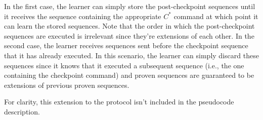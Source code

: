 In the first case, the learner can simply store the post-checkpoint sequences until it receives the sequence containing the appropriate $C^*$ command at which point it can learn the stored sequences. Note that the order in which the post-checkpoint sequences are executed is irrelevant since they're extensions of each other. In the second case, the learner receives sequences sent before the checkpoint sequence that it has already executed. In this scenario, the learner can simply discard these sequences since it knows that it executed a subsequent sequence (i.e., the one containing the checkpoint command) and proven sequences are guaranteed to be extensions of previous proven sequences. \par
For clarity, this extension to the protocol isn't included in the pseudocode description.